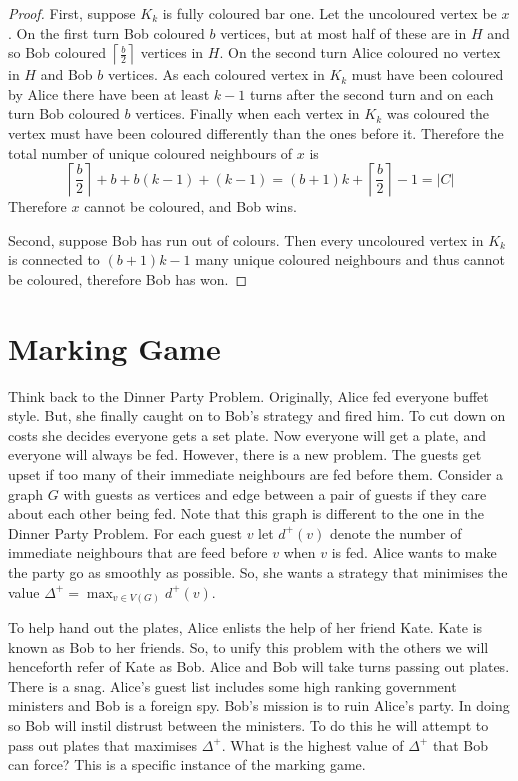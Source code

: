 \begin{proof}
First, suppose $K_k$ is fully coloured bar one. Let the uncoloured vertex be $x$. On the first turn Bob coloured $b$ vertices, but at most half of these are in $H$ and so Bob coloured $\left\lceil \frac{b}{2}\right\rceil$ vertices in $H$. On the second turn Alice coloured no vertex in $H$ and Bob $b$ vertices. As each coloured vertex in $K_k$ must have been coloured by Alice there have been at least $k-1$ turns after the second turn and on each turn Bob coloured $b$ vertices. Finally when each vertex in $K_k$ was coloured the vertex must have been coloured differently than the ones before it. Therefore the total number of unique coloured neighbours of $x$ is 
%
\[\left\lceil \frac{b}{2}\right\rceil+b +b(k-1)+(k-1)=(b+1)k+\left\lceil \frac{b}{2}\right\rceil-1 = |C|\]
%
Therefore $x$ cannot be coloured, and Bob wins.

Second, suppose Bob has run out of colours. Then every uncoloured vertex in $K_k$ is connected to $(b+1)k-1$ many unique coloured neighbours and thus cannot be coloured, therefore Bob has won.
\end{proof}

\section{Marking Game}\label{sec:marking_game}

Think back to the Dinner Party Problem. Originally, Alice fed everyone buffet style. But, she finally caught on to Bob's strategy and fired him. To cut down on costs she decides everyone gets a set plate. Now everyone will get a plate, and everyone will always be fed. However, there is a new problem. The guests get upset if too many of their immediate neighbours are fed before them. Consider a graph $G$ with guests as vertices and edge between a pair of guests if they care about each other being fed. Note that this graph is different to the one in the Dinner Party Problem. For each guest $v$ let $d^+(v)$ denote the number of immediate neighbours that are feed before $v$ when $v$ is fed. Alice wants to make the party go as smoothly as possible. So, she wants a strategy that minimises the value $\Delta^+=\max_{v\in V(G)} d^+(v)$.

To help hand out the plates, Alice enlists the help of her friend Kate. Kate is known as Bob to her friends. So, to unify this problem with the others we will henceforth refer of Kate as Bob. Alice and Bob will take turns passing out plates. There is a snag. Alice's guest list includes some high ranking government ministers and Bob is a foreign spy. Bob's mission is to ruin Alice's party. In doing so Bob will instil distrust between the ministers. To do this he will attempt to pass out plates that maximises $\Delta^+$. What is the highest value of $\Delta^+$ that Bob can force? This is a specific instance of the marking game.

